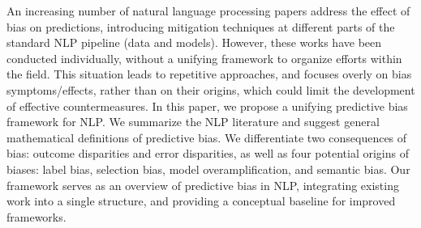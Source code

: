 An increasing number of natural language processing papers address the effect of bias on predictions, introducing mitigation techniques at different parts of the standard NLP pipeline (data and models). However, these works have been conducted individually, without a unifying framework to organize efforts within the field. This situation leads to repetitive approaches, and focuses overly on bias symptoms/effects, rather than on their origins, which could limit the development of effective countermeasures. In this paper, we propose a unifying predictive bias framework for NLP. We summarize the NLP literature and suggest general mathematical definitions of predictive bias. We differentiate two consequences of bias: outcome disparities and error disparities, as well as four potential origins of biases: label bias, selection bias, model overamplification, and semantic bias. Our framework serves as an overview of predictive bias in NLP, integrating existing work into a single structure, and providing a conceptual baseline for improved frameworks.
